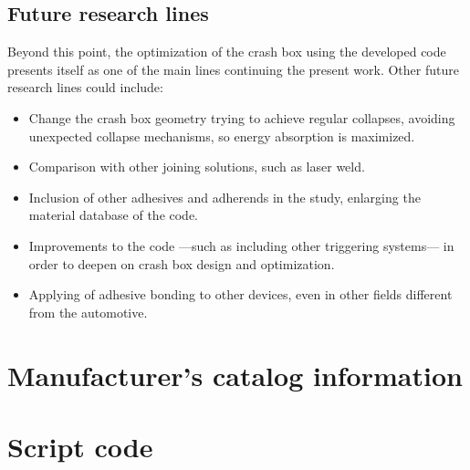 \documentclass[
documentsize = a4, %
font = cmr, %
typesize = 11, %
printmode = true,
onehalfspacing = true,
language = en, %
titlepage = udciccp, %
degree = pt, %
dedication = true,
acknowledgements = true,
abstract-en = true,
abstract-es = false,
abstract-ga = false,
epigraphs = true,
toc = true,
lof = true,
lot = true,
frontmatterintoc = false,
notation = false,
minimal = false,
]{UDCthesis}
\begin{document}
\section{Future research lines}

Beyond this point, the optimization of the crash box using the developed code presents itself as one of the main lines continuing the present work. Other future research lines could include:

\begin{itemize}
	\item Change the crash box geometry trying to achieve regular collapses, avoiding unexpected collapse mechanisms, so energy absorption is maximized.

	\item Comparison with other joining solutions, such as laser weld.

	\item Inclusion of other adhesives and adherends in the study, enlarging the material database of the code.

	\item Improvements to the code ---such as including other triggering systems--- in order to deepen on crash box design and optimization.

	\item Applying of  adhesive bonding to other devices, even in other fields different from the automotive.
\end{itemize}

\printbibliography

\appendix

\chapter{Manufacturer's catalog information}
\label{apx:manuf}





\chapter{Script code}
\label{apx:script}

\inputminted[breaklines=true, fontsize=\footnotesize]{python}{codes/paramodel.py}
\end{document}

